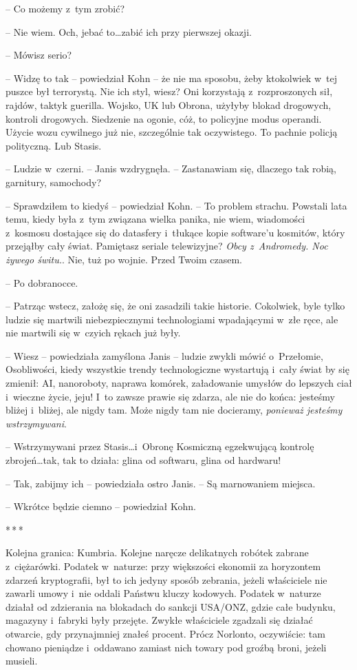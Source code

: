 \documentclass[oneside,polish,11pt,sfheadings]{mwbk}
\newcommand{\threeast}{\bigskip\par\centerline{*\,*\,*}\medskip\par}%
\begin{document}
-- Co możemy z~tym zrobić?

-- Nie wiem. Och, jebać to\ldots zabić ich przy pierwszej okazji.

-- Mówisz serio?

-- Widzę to tak -- powiedział Kohn -- że nie ma sposobu, żeby ktokolwiek w~tej puszce był terrorystą. Nie ich styl, wiesz? Oni korzystają z~rozproszonych sił, rajdów, taktyk guerilla. Wojsko, UK lub Obrona,
użyłyby blokad drogowych, kontroli drogowych. Siedzenie na ogonie, cóż,
to policyjne modus operandi. Użycie wozu cywilnego już nie, szczególnie
tak oczywistego. To pachnie policją polityczną. Lub Stasis.

-- Ludzie w~czerni. -- Janis wzdrygnęła. -- Zastanawiam się, dlaczego tak
robią, garnitury, samochody?

-- Sprawdziłem to kiedyś -- powiedział Kohn. -- To problem strachu.
Powstali lata temu, kiedy była z~tym związana wielka panika, nie wiem,
wiadomości z~kosmosu dostające się do datasfery i~tłukące kopie
software'u kosmitów, który przejąłby cały świat. Pamiętasz seriale
telewizyjne? \emph{Obcy z~Andromedy. Noc żywego świtu.}. Nie, tuż po
wojnie. Przed Twoim czasem.

-- Po dobranocce.

-- Patrząc wstecz, założę się, że oni zasadzili takie historie.
Cokolwiek, byle tylko ludzie się martwili niebezpiecznymi technologiami
wpadającymi w~złe ręce, ale nie martwili się w~czyich rękach już były.

-- Wiesz -- powiedziała zamyślona Janis -- ludzie zwykli mówić o~Przełomie,
Osobliwości, kiedy wszystkie trendy technologiczne wystartują i~cały
świat by się zmienił: AI, nanoroboty, naprawa komórek, załadowanie
umysłów do lepszych ciał i~wieczne życie, jeju! I~to zawsze prawie się
zdarza, ale nie do końca: jesteśmy bliżej i~bliżej, ale nigdy tam. Może
nigdy tam nie docieramy, \emph{ponieważ jesteśmy wstrzymywani}.

-- Wstrzymywani przez Stasis\ldots i~Obronę Kosmiczną egzekwującą kontrolę
zbrojeń\ldots tak, tak to działa: glina od softwaru, glina od hardwaru!

-- Tak, zabijmy ich -- powiedziała ostro Janis. -- Są marnowaniem miejsca.

-- Wkrótce będzie ciemno -- powiedział Kohn.
  \threeast 

Kolejna granica: Kumbria. Kolejne naręcze delikatnych robótek zabrane z~ciężarówki. Podatek w~naturze: przy większości ekonomii za horyzontem
zdarzeń kryptografii, był to ich jedyny sposób zebrania, jeżeli
właściciele nie zawarli umowy i~nie oddali Państwu kluczy kodowych.
Podatek w~naturze działał od zdzierania na blokadach do sankcji USA/ONZ,
gdzie całe budynku, magazyny i~fabryki były przejęte. Zwykłe właściciele
zgadzali się działać otwarcie, gdy przynajmniej znałeś procent. Prócz
Norlonto, oczywiście: tam chowano pieniądze i~oddawano zamiast nich
towary pod groźbą broni, jeżeli musieli.
\end{document}
